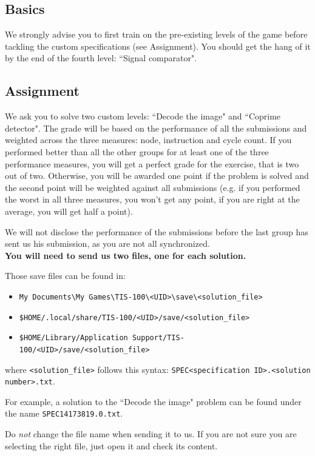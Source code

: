 \documentclass[10pt,a4paper]{article}
\theoremstyle{definition}%
\newtheorem{Q}{Question}[] %
\begin{document}
\subsection{Basics}

We strongly advise you to first train on the pre-existing levels of the game before tackling the custom specifications (see Assignment).
You should get the hang of it by the end of the fourth level: ``Signal comparator".

\subsection{Assignment}
We ask you to solve two custom levels: ``Decode the image" and ``Coprime detector".
The grade will be based on the performance of all the submissions and weighted across the three measures: node, instruction and cycle count.
If you performed better than all the other groups for at least one of the three performance measures, you will get a perfect grade for the exercise, that is two out of two.
Otherwise, you will be awarded one point if the problem is solved and the second point will be weighted against all submissions (e.g. if you performed the worst in all three measures, you won't get any point, if you are right at the average, you will get half a point).

We will not disclose the performance of the submissions before the last group has sent us his submission, as you are not all synchronized.
~\\

\textbf{You will need to send us two  files, one for each solution.}

Those save files can be found in:
\begin{itemize}
	\item[\faWindows] \verb|My Documents\My Games\TIS-100\<UID>\save\<solution_file>|
	\item[\faLinux] \verb|$HOME/.local/share/TIS-100/<UID>/save/<solution_file>|
	\item[\faApple] \verb|$HOME/Library/Application Support/TIS-100/<UID>/save/<solution_file>|
\end{itemize}
where \texttt{<solution\_file>} follows this syntax: \texttt{SPEC<specification ID>.<solution number>.txt}.

For example, a solution to the ``Decode the image" problem can be found under the name \texttt{SPEC14173819.0.txt}.

Do \textit{not} change the file name when sending it to us.
If you are not sure you are selecting the right file, just open it and check its content.

\end{document}

